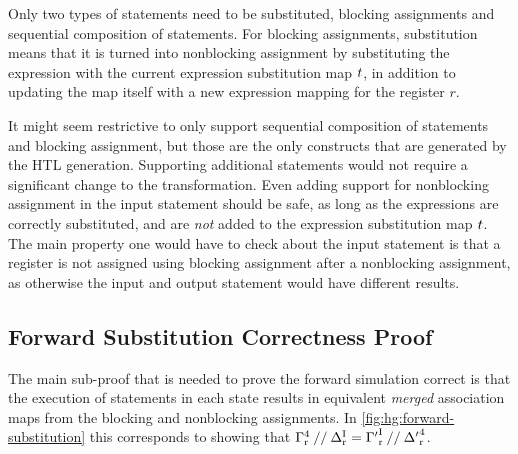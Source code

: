 \begin{definition}%
  \label{def:substitute-statements}

  Only two types of statements need to be substituted, blocking assignments and
  sequential composition of statements.  For blocking assignments, substitution
  means that it is turned into nonblocking assignment by substituting the
  expression with the current expression substitution map $t$, in
  addition to updating the map itself with a new expression mapping for the
  register $r$.

\end{definition}

It might seem restrictive to only support sequential composition of statements
and blocking assignment, but those are the only constructs that are generated by
the HTL generation.  Supporting additional statements would not require a
significant change to the transformation.  Even adding support for nonblocking
assignment in the input statement should be safe, as long as the expressions are
correctly substituted, and are \emph{not} added to the expression substitution
map $t$.  The main property one would have to check about the input
statement is that a register is not assigned using blocking assignment after a
nonblocking assignment, as otherwise the input and output statement would have
different results.

\subsection{Forward Substitution Correctness Proof}%
\label{sec:hg:forward-substitution-correctness-proof}

The main sub-proof that is needed to prove the forward simulation correct is
that the execution of statements in each state results in equivalent
\emph{merged} association maps from the blocking and nonblocking assignments.
In \cref{fig:hg:forward-substitution} this corresponds to showing that
${\Gamma}^{4}_{\mathrm r} \mathbin{//} \Delta^{\mathrm I}_{\mathrm r} =
{\Gamma'}^{\mathrm I}_{\mathrm r} \mathbin{//} {\Delta'}^4_{\mathrm r}$. 

